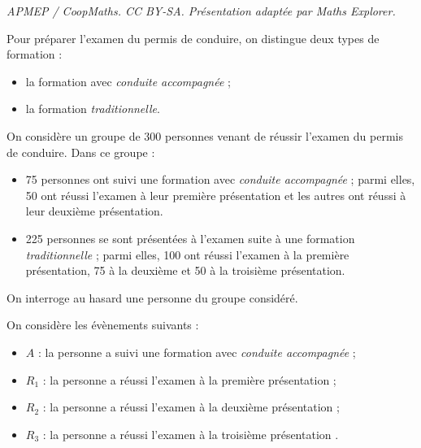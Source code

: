 \documentclass[10pt]{article}
\begin{document}
\noindent\textit{APMEP / CoopMaths. CC BY-SA. Présentation adaptée par Maths Explorer.}\par\medskip
\medskip

Pour préparer l’examen du permis de conduire, on distingue deux types de formation :

\begin{itemize}
\item la formation avec \emph{conduite accompagnée} ;
\item la formation \emph{traditionnelle}.
\end{itemize}

On considère un groupe de 300 personnes venant de réussir l’examen du permis de conduire. Dans ce groupe :

\begin{itemize}
\item 75 personnes ont suivi une formation avec \emph{conduite accompagnée} ; parmi elles, 50 ont réussi l’examen à leur première présentation et les autres ont réussi à leur deuxième présentation.
\item  225 personnes se sont présentées à l’examen suite à une formation \emph{traditionnelle} ; parmi elles, 100 ont réussi l’examen à la première présentation, 75 à la deuxième et 50 à la troisième présentation.
\end{itemize}

On interroge au hasard une personne du groupe considéré.

On considère les évènements suivants :
\begin{itemize}
\item [] $A$ : \og la personne a suivi une formation avec \emph{conduite accompagnée} \fg{} ;
\item [] $R_1$ : \og la personne a réussi l’examen à la première présentation \fg{} ;
\item []$R_2$ : \og la personne a réussi l’examen à la deuxième présentation \fg{} ;
\item []$R_3$ : \og la personne a réussi l’examen à la troisième présentation \fg.
\end{itemize}

\medskip
\end{document}
